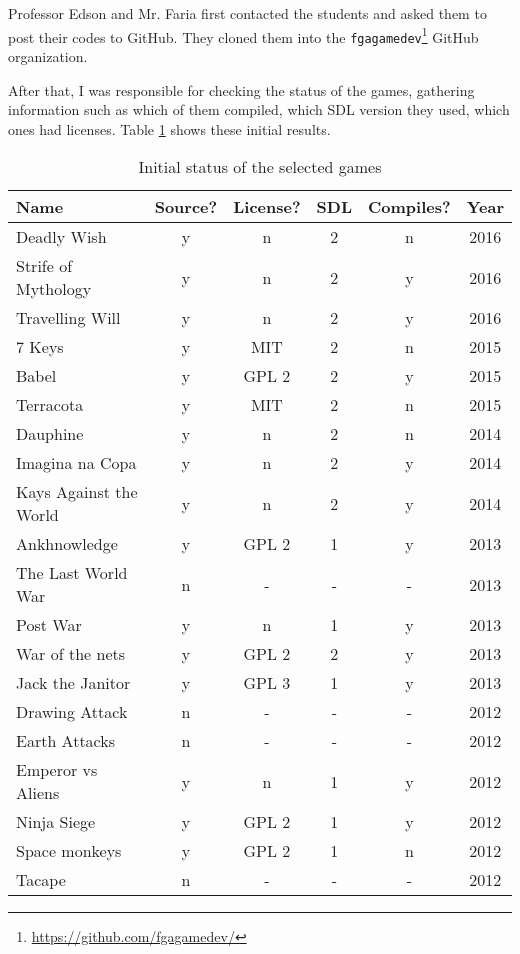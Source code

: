 Professor Edson and Mr. Faria first contacted the students and asked them to post their codes to GitHub. They cloned them into the \texttt{fgagamedev}\footnote{ \href{https://github.com/fgagamedev}{https://github.com/fgagamedev/} } GitHub organization.

After that, I was responsible for checking the status of the games, gathering information such as which of them compiled, which SDL version they used, which ones had licenses. Table \ref{tab:first_games} shows these initial results.


\begin{table}[h!]
\centering
\caption{Initial status of the selected games}
\label{tab:first_games}
\begin{tabular}{lccccc}
\toprule
\textbf{Name} & \textbf{Source?} & \textbf{License?} & \textbf{SDL} & \textbf{Compiles?} & \textbf{Year}\\
\midrule
Deadly Wish & y & n & 2 & n & 2016 \\
Strife of Mythology & y & n & 2 & y & 2016 \\
Travelling Will & y & n & 2 & y & 2016 \\
7 Keys & y & MIT & 2 & n & 2015 \\
Babel & y & GPL 2 & 2 & y & 2015 \\
Terracota & y & MIT & 2 & n & 2015 \\
Dauphine & y & n & 2 & n & 2014 \\
Imagina na Copa & y & n & 2 & y & 2014 \\
Kays Against the World & y & n & 2 & y & 2014 \\
Ankhnowledge & y & GPL 2 & 1 & y & 2013 \\
The Last World War & n & - & - & - & 2013 \\
Post War & y & n & 1 & y & 2013 \\
War of the nets & y & GPL 2 & 2 & y & 2013 \\
Jack the Janitor & y & GPL 3 & 1 & y & 2013 \\
Drawing Attack & n & - & - & - & 2012 \\
Earth Attacks & n & - & - & - & 2012 \\
Emperor vs Aliens & y & n & 1 & y & 2012 \\
Ninja Siege & y & GPL 2 & 1 & y & 2012 \\
Space monkeys & y & GPL 2 & 1 & n & 2012 \\
Tacape & n & - & - & - & 2012 \\
\bottomrule
\end{tabular}
\end{table}

